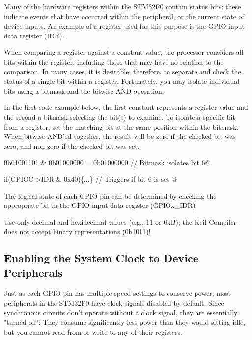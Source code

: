 \documentclass[openany,11pt,fleqn]{book} %
\makeatletter
\newcommand{\ilcode}[1]{
    \begin{center} \parskip=-15pt \colorbox{gray!20!white}{
        \parbox{\columnwidth-2\fboxsep}{
            \lstinline@#1@
        }
    } \end{center}
}
\makeatother
\begin{document}
Many of the hardware registers within the STM32F0 contain status bits: these indicate events that have occurred within the peripheral, or the current state of device inputs. An example of a register used for this purpose is the GPIO input data register (IDR).

When comparing a register against a constant value, the processor considers all bits within the register, including those that may have no relation to the comparison. In many cases, it is desirable, therefore, to separate and check the status of a single bit within a register. Fortunately, you may isolate individual bits using a bitmask and the bitwise AND operation. 

\begin{example} 
In the first code example below, the first constant represents a register value and the second a bitmask selecting the bit(s) to examine. To isolate a specific bit from a register, set the matching bit at the same position within the bitmask. When bitwise AND'ed together, the result will be zero if the checked bit was zero, and non-zero if the checked bit was set. 

\ilcode{0b01001101 \& 0b01000000 = 0b01000000  // Bitmask isolates bit 6}

\ilcode{if(GPIOC->IDR \& 0x40)\{...\} // Triggers if bit 6 is set }
\smallskip
\end{example}

\begin{exercise}
    The logical state of each GPIO pin can be determined by checking the appropriate bit in the GPIO input data register (GPIOx\_IDR). 
    
\end{exercise}   

\begin{warning}
	Use only decimal and hexidecimal values (e.g., 11 or 0xB); the Keil Compiler does not accept binary representations (0b1011)!
\end{warning} 
    
\subsection{Enabling the System Clock to Device Peripherals}

Just as each GPIO pin has multiple speed settings to conserve power, most peripherals in the STM32F0 have clock signals disabled by default. Since synchronous circuits don't operate without a clock signal, they are essentially "turned-off"; They consume significantly less power than they would sitting idle, but you cannot read from or write to any of their registers.
\end{document}
